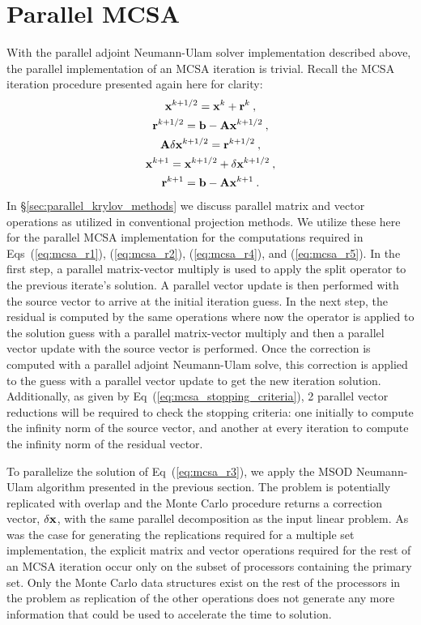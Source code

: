 \section{Parallel MCSA\ }
\label{sec:parallel_mcsa}
With the parallel adjoint Neumann-Ulam solver implementation described
above, the parallel implementation of an MCSA iteration is
trivial. Recall the MCSA iteration procedure presented again here for
clarity:
\begin{subequations}
  \begin{gather}
    \label{eq:mcsa_r1}
    \mathbf{x}^{k+1/2} = \mathbf{x}^k + \mathbf{r}^k\:,\\
    \label{eq:mcsa_r2}
    \mathbf{r}^{k+1/2} = \mathbf{b} - \mathbf{A}\mathbf{x}^{k+1/2}\:,\\
    \label{eq:mcsa_r3}
    \mathbf{A}\delta\mathbf{x}^{k+1/2} = \mathbf{r}^{k+1/2}\:,\\
    \label{eq:mcsa_r4}
    \mathbf{x}^{k+1} = \mathbf{x}^{k+1/2} + \delta \mathbf{x}^{k+1/2}\:,\\
    \label{eq:mcsa_r5}
    \mathbf{r}^{k+1} = \mathbf{b} - \mathbf{A}\mathbf{x}^{k+1}\:.
  \end{gather}
\end{subequations}
In \S\ref{sec:parallel_krylov_methods} we discuss parallel matrix and
vector operations as utilized in conventional projection methods. We
utilize these here for the parallel MCSA implementation for the
computations required in Eqs~(\ref{eq:mcsa_r1}), (\ref{eq:mcsa_r2}),
(\ref{eq:mcsa_r4}), and (\ref{eq:mcsa_r5}). In the first step, a
parallel matrix-vector multiply is used to apply the split operator to
the previous iterate's solution. A parallel vector update is then
performed with the source vector to arrive at the initial iteration
guess. In the next step, the residual is computed by the same
operations where now the operator is applied to the solution guess
with a parallel matrix-vector multiply and then a parallel vector
update with the source vector is performed. Once the correction is
computed with a parallel adjoint Neumann-Ulam solve, this correction
is applied to the guess with a parallel vector update to get the new
iteration solution. Additionally, as given by
Eq~(\ref{eq:mcsa_stopping_criteria}), 2 parallel vector reductions
will be required to check the stopping criteria: one initially to
compute the infinity norm of the source vector, and another at every
iteration to compute the infinity norm of the residual vector.

To parallelize the solution of Eq~(\ref{eq:mcsa_r3}), we apply the
MSOD Neumann-Ulam algorithm presented in the previous section. The
problem is potentially replicated with overlap and the Monte Carlo
procedure returns a correction vector, $\delta \mathbf{x}$, with the same
parallel decomposition as the input linear problem. As was the case
for generating the replications required for a multiple set
implementation, the explicit matrix and vector operations required for
the rest of an MCSA iteration occur only on the subset of processors
containing the primary set. Only the Monte Carlo data structures exist
on the rest of the processors in the problem as replication of the
other operations does not generate any more information that could be
used to accelerate the time to solution.

